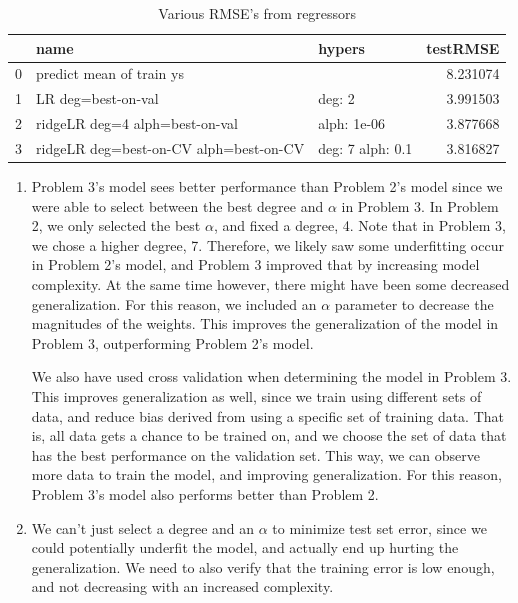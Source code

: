 \documentclass[12pt]{article}
\begin{document}
\begin{table}[h]
    \centering
    \begin{tabular}{lllr}
        \toprule
         & name & hypers & testRMSE \\
        \midrule
        0 & predict mean of train ys &  & 8.231074 \\
        1 & LR deg=best-on-val & deg: 2 & 3.991503 \\
        2 & ridgeLR deg=4 alph=best-on-val & alph: 1e-06 & 3.877668 \\
        3 & ridgeLR deg=best-on-CV alph=best-on-CV & deg: 7 alph: 0.1 & 3.816827 \\
        \bottomrule
        \end{tabular}
    \caption{Various RMSE's from regressors}

    \begin{enumerate}[label=(\roman*)]
        \item Problem 3's model sees better performance than Problem 2's model
        since we were able to select between the best degree and $\alpha$ in
        Problem 3. In Problem 2, we only selected the best $\alpha$, and fixed
        a degree, 4. Note that in Problem 3, we chose a higher degree, 7.
        Therefore, we likely saw some underfitting occur in Problem 2's model,
        and Problem 3 improved that by increasing model complexity. At the same
        time however, there might have been some decreased generalization. For
        this reason, we included an $\alpha$ parameter to decrease the
        magnitudes of the weights. This improves the generalization of the
        model in Problem 3, outperforming Problem 2's model.

        We also have used cross validation when determining the model in
        Problem 3. This improves generalization as well, since we train using
        different sets of data, and reduce bias derived from using a specific
        set of training data. That is, all data gets a chance to be trained on,
        and we choose the set of data that has the best performance on the
        validation set. This way, we can observe more data to train the model,
        and improving generalization. For this reason, Problem 3's model also
        performs better than Problem 2.

        \item We can't just select a degree and an $\alpha$ to minimize test
        set error, since we could potentially underfit the model, and actually
        end up hurting the generalization. We need to also verify that the
        training error is low enough, and not decreasing with an increased complexity.
        
    \end{enumerate}
    
\end{table}
\end{document}
